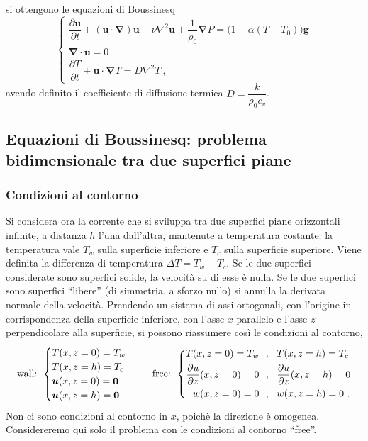 \documentclass{article}
\begin{document}
si ottengono le equazioni di Boussinesq
\begin{equation}
    \begin{cases}
      \dfrac{\partial \bm{u}}{\partial t} + 
      \left( \bm{u} \cdot \bm{\nabla} \right) \bm{u} -
      \nu \nabla^2 \bm{u} + \dfrac{1}{\rho_0}\bm{\nabla} P = \big( 1 - \alpha ( T-T_0 ) \big) \bm{g} \\
      \bm{\nabla} \cdot \bm{u} = 0 \\
      \dfrac{\partial T}{\partial t} + \bm{u} \cdot 
      \bm{\nabla} T =  D \nabla^2 T \ ,
    \end{cases}
\end{equation}
avendo definito il coefficiente di diffusione termica $D = \dfrac{k}{\rho_0 c_v}$.

\subsection{Equazioni di Boussinesq: problema bidimensionale tra due superfici piane}

\subsubsection{Condizioni al contorno}
Si considera ora la corrente che si sviluppa tra due superfici piane orizzontali infinite, a distanza $h$ l'una dall'altra, mantenute a temperatura costante: la temperatura vale $T_w$ sulla superficie inferiore e $T_c$ sulla superficie superiore. Viene definita la differenza di temperatura $\Delta T = T_w - T_c$.
\newline
Se le due superfici considerate sono superfici solide, la velocità su di esse è nulla. Se le due superfici sono superfici ``libere'' (di simmetria, a sforzo nullo) si annulla la derivata normale della velocità. Prendendo un sistema di assi ortogonali, con l'origine in corrispondenza della superficie inferiore, con l'asse $x$ parallelo e l'asse $z$ perpendicolare alla superficie, si possono riassumere così le condizioni al contorno,
\begin{equation}
    \text{wall: }
    \begin{cases}
      T(x,z=0) = T_w \\ T(x,z=h) = T_c \\
      \bm{u}(x,z=0) = \bm{0} \\ \bm{u}(x,z=h) = \bm{0}
    \end{cases}  \hspace{0.5cm}
    \text{free: } \left\{
    \begin{aligned}
      T(x,z=0) = T_w \ & \ , \ \ T(x,z=h) = T_c \\
      \dfrac{\partial u}{\partial z}(x,z=0) = 0 \ & \ , \ \ \dfrac{\partial u}{\partial z}(x,z=h) = 0 \\
      w(x,z=0) = 0 \ & \  , \  \  w(x,z=h) = 0 \ .
    \end{aligned} \right.
\end{equation}
Non ci sono condizioni al contorno in $x$, poichè la direzione è omogenea. Considereremo qui solo il problema con le condizioni al contorno ``free''.
\end{document}
